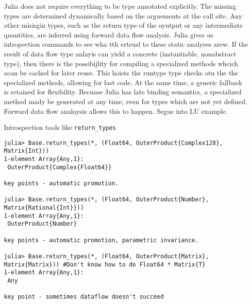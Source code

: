 Julia does not require everything to be type annotated explicitly. The missing types are determined dynamically based on the arguements at the call site. Any other misisgin types, such as the return type of the oyutput or any intermediate quantities, are inferred using forward data flow analysis. Julia gives us intropection commands to see wha tth erteusl to these static analyses arew. If the result of data flow type anlayis can yield a concrete (instantiable, nonabstract type), then there is the possibijlity for compiling a specialized methods whcich acan be cached for later reuse. This hoists the runtype type checks otu the the specialized methods, allowing for fast code. At the same time, a generic fallback is retained for flexibility. Becuase Julia has late binding semantics, a specialized method mady be generated at any time, even for types which are not yet defined. Forward data flow analaysis allows this to happen. Segue into LU example.

Introspection tools like \lstinline|return_types|

\begin{lstlisting}
julia> Base.return_types(*, (Float64, OuterProduct{Complex128}, Matrix{Int}))
1-element Array{Any,1}:
 OuterProduct{Complex{Float64}}

key points - automatic promotion.

julia> Base.return_types(*, (Float64, OuterProduct{Number}, Matrix{Rational{Int}}))
1-element Array{Any,1}:
 OuterProduct{Number}

key points - automatic promotion, parametric invariance.

julia> Base.return_types(*, (Float64, OuterProduct{Matrix}, Matrix{Matrix})) #Don't know how to do Float64 * Matrix{T}
1-element Array{Any,1}:
 Any

key point - sometimes dataflow doesn't succeed

\end{lstlisting}
